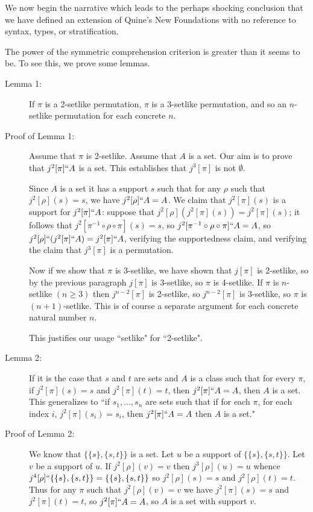\documentclass[12pt]{article}
\begin{document}
We now begin the narrative which leads to the perhaps shocking conclusion that we have defined an extension of Quine's New Foundations with no reference to syntax, types, or stratification.

The power of the symmetric comprehension criterion is greater than it seems to be.  To see this, we prove some lemmas.

\begin{description}

\item[Lemma 1:]  If $\pi$ is a 2-setlike permutation, $\pi$ is a 3-setlike permutation, and so an $n$-setlike permutation for each concrete $n$.

\item[Proof of Lemma 1:]  Assume that $\pi$ is 2-setlike.  Assume that $A$ is a set.  Our aim is to prove that $j^2[\pi]``A$ is a set.  This establishes
that $j^3[\pi]$ is not $\emptyset$.

Since $A$ is a set it has a support $s$ such that for any $\rho$ such that $j^2[\rho](s)=s$, we have $j^2[\rho]``A = A$.   We claim that
$j^2[\pi](s)$ is a support for $j^2[\pi]``A$:  suppose that $j^2[\rho](j^2[\pi](s)) = j^2[\pi](s)$;  it follows that $j^2[\pi^{-1} \circ \rho \circ \pi](s) = s$,
so  $j^2[\pi^{-1} \circ \rho \circ \pi]``A = A$, so $j^2[\rho]``(j^2[\pi]``A) = j^2[\pi]``A$, verifying the supportedness claim, and verifying the claim that
$j^3[\pi]$ is a permutation.

Now if we show that $\pi$ is 3-setlike, we have shown that $j[\pi]$ is 2-setlike, so by the previous paragraph $j[\pi]$ is 3-setlike, so $\pi$ is 4-setlike.
If $\pi$ is $n$-setlike $(n \geq 3)$ then $j^{n-2}[\pi]$ is 2-setlike, so $j^{n-2}[\pi]$ is 3-setlike, so $\pi$ is $(n+1)$-setlike.  This is of course
a separate argument for each concrete natural number $n$.

This justifies our usage ``setlike" for ``2-setlike".

\item[Lemma 2:]  If it is the case that $s$ and $t$ are sets and $A$ is a class such that for every $\pi$, if $j^2[\pi](s)=s$ and $j^2[\pi](t)=t$, then $j^2[\pi]``A=A$, 
then $A$ is a set.  This generalizes to ``if $s_1,\ldots,s_n$ are sets such that if for each $\pi$, for each index $i$, $j^2[\pi](s_i)=s_i$, then $j^2[\pi]``A=A$
then $A$ is a set."

\item[Proof of Lemma 2:]  We know that $\{\{s\},\{s,t\}\}$ is a set.  Let $u$ be a support of $\{\{s\},\{s,t\}\}$.  Let $v$ be a support of $u$.
If $j^2[\rho](v)=v$ then $j^3[\rho](u) = u$ whence $j^4[\rho]``\{\{s\},\{s,t\}\}= \{\{s\},\{s,t\}\}$ so $j^2[\rho](s)=s$ and $j^2[\rho](t)=t$.
Thus for any $\pi$ such that $j^2[\rho](v)=v$ we have $j^2[\pi](s)=s$ and $j^2[\pi](t)=t$, so $j^2[\pi]``A=A$, so $A$ is a set with support $v$.


\end{description}
\end{document}
